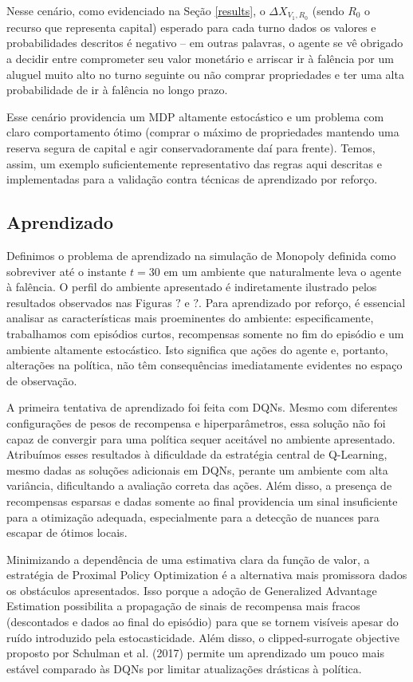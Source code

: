 \documentclass[conference]{IEEEtran}
\begin{document}
Nesse cenário, como evidenciado na Seção \ref{results}, o $\Delta X_{V_1,R_0}$ (sendo $R_0$ o recurso que representa capital) esperado para cada turno dados os valores e probabilidades descritos é negativo -- em outras palavras, o agente se vê obrigado a decidir entre comprometer seu valor monetário e arriscar ir à falência por um aluguel muito alto no turno seguinte ou não comprar propriedades e ter uma alta probabilidade de ir à falência no longo prazo.

Esse cenário providencia um MDP altamente estocástico e um problema com claro comportamento ótimo (comprar o máximo de propriedades mantendo uma reserva segura de capital e agir conservadoramente daí para frente). Temos, assim, um exemplo suficientemente representativo das regras aqui descritas e implementadas para a validação contra técnicas de aprendizado por reforço.

\subsection{Aprendizado}
\label{learning}
Definimos o problema de aprendizado na simulação de Monopoly definida como sobreviver até o instante $t=30$ em um ambiente que naturalmente leva o agente à falência. O perfil do ambiente apresentado é indiretamente ilustrado pelos resultados observados nas Figuras $?$ e $?$. Para aprendizado por reforço, é essencial analisar as características mais proeminentes do ambiente: especificamente, trabalhamos com episódios curtos, recompensas somente no fim do episódio e um ambiente altamente estocástico. Isto significa que ações do agente e, portanto, alterações na política, não têm consequências imediatamente evidentes no espaço de observação.

A primeira tentativa de aprendizado foi feita com DQNs\cite{dqn}. Mesmo com diferentes configurações de pesos de recompensa e hiperparâmetros, essa solução não foi capaz de convergir para uma política sequer aceitável no ambiente apresentado. Atribuímos esses resultados à dificuldade da estratégia central de Q-Learning, mesmo dadas as soluções adicionais em DQNs, perante um ambiente com alta variância, dificultando a avaliação correta das ações. Além disso, a presença de recompensas esparsas e dadas somente ao final providencia um sinal insuficiente para a otimização adequada, especialmente para a detecção de nuances para escapar de ótimos locais.

Minimizando a dependência de uma estimativa clara da função de valor, a estratégia de Proximal Policy Optimization\cite{ppo} é a alternativa mais promissora dados os obstáculos apresentados. Isso porque a adoção de Generalized Advantage Estimation possibilita a propagação de sinais de recompensa mais fracos (descontados e dados ao final do episódio) para que se tornem visíveis apesar do ruído introduzido pela estocasticidade. Além disso, o clipped-surrogate objective proposto por Schulman et al. (2017) permite um aprendizado um pouco mais estável comparado às DQNs por limitar atualizações drásticas à política.
\end{document}
